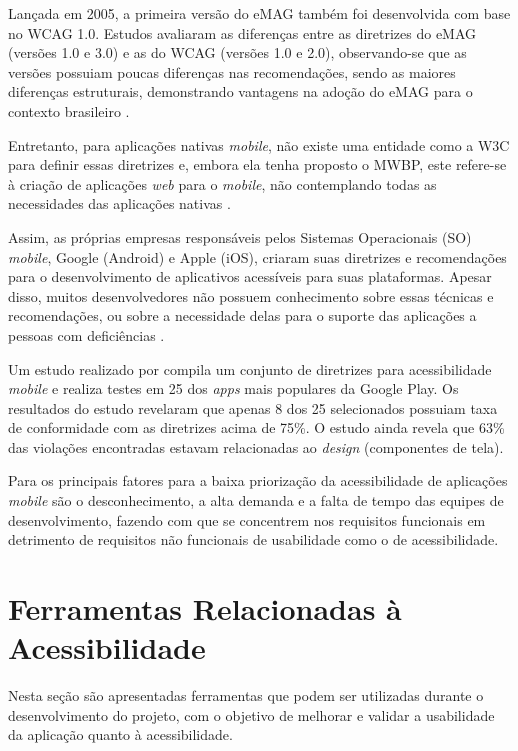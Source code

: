 Lançada em 2005, a primeira versão do eMAG também foi desenvolvida com base no WCAG 1.0. Estudos avaliaram as diferenças entre as diretrizes do eMAG
(versões 1.0 e 3.0) e as do WCAG (versões 1.0 e 2.0), observando-se que as versões possuiam poucas
diferenças nas recomendações, sendo as maiores diferenças estruturais, demonstrando vantagens na adoção do eMAG para o
contexto brasileiro \cite{Bach_2009,Rocha_2013}.

Entretanto, para aplicações nativas \textit{mobile}, não existe uma entidade como a W3C para definir essas diretrizes e, embora
ela tenha proposto o MWBP, este refere-se à criação de aplicações \emph{web} para o \emph{mobile}, não contemplando todas
as necessidades das aplicações nativas \cite{W3C_2008}.

Assim, as próprias empresas responsáveis pelos Sistemas Operacionais (SO) \emph{mobile}, Google (Android) e Apple (iOS),
criaram suas diretrizes e recomendações para o desenvolvimento de aplicativos acessíveis para suas plataformas.
Apesar disso, muitos desenvolvedores não possuem conhecimento sobre essas técnicas e recomendações, ou sobre a necessidade delas
para o suporte das aplicações a pessoas com deficiências \cite{Quispe2020,Bi2021}.

Um estudo realizado por  compila um conjunto de diretrizes para acessibilidade \textit{mobile} e realiza
testes em 25 dos \textit{apps} mais populares da Google Play. Os resultados do estudo revelaram que apenas 8 dos 25 selecionados
possuiam taxa de conformidade com as diretrizes acima de 75\%. O estudo ainda revela que 63\% das violações encontradas estavam
relacionadas ao \textit{design} (componentes de tela).

Para  os principais fatores para a baixa priorização da acessibilidade de aplicações \textit{mobile}
são o desconhecimento, a alta demanda e a falta de tempo das equipes de desenvolvimento, fazendo com que se concentrem nos
requisitos funcionais em detrimento de requisitos não funcionais de usabilidade como o de acessibilidade.

\section{Ferramentas Relacionadas à Acessibilidade}
Nesta seção são apresentadas ferramentas que podem ser utilizadas durante o desenvolvimento do projeto, com o objetivo de melhorar e validar a usabilidade
da aplicação quanto à acessibilidade.

